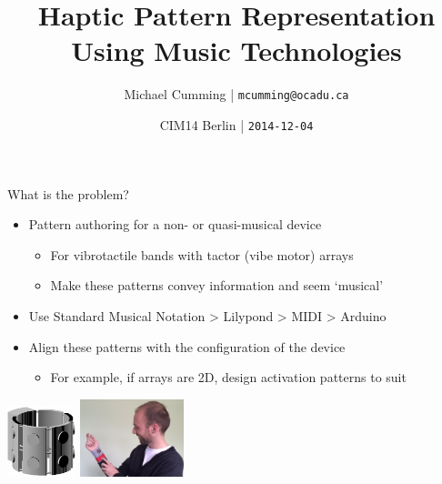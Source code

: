 \documentclass[handout]{beamer}
\title{Haptic Pattern Representation\\ Using Music Technologies}
\date[ISPN ’80]{CIM14 Berlin | \texttt{2014-12-04}}
\author[MJC]{Michael Cumming | \texttt{mcumming@ocadu.ca}}
\begin{document}
\begin{frame}
\titlepage
\end{frame}

\begin{frame}{What is the problem?}
\begin{itemize}
\item Pattern authoring for a non- or quasi-musical device
\begin{itemize}
\item For vibrotactile bands with tactor (vibe motor) arrays
\item Make these patterns convey information and seem `musical'
\end{itemize}
\item Use Standard Musical Notation > Lilypond > MIDI > Arduino 
\item Align these patterns with the configuration of the device
\begin{itemize}
\item For example, if arrays are 2D, design activation patterns to suit
\end{itemize}
\end{itemize}
\bigskip
\centering
\includegraphics[width=2cm]{graphics/bracelet-02.png}
\hspace{1em}
\includegraphics[width=3cm]{graphics/hudsonBand.png} 

\end{frame}
\end{document}
